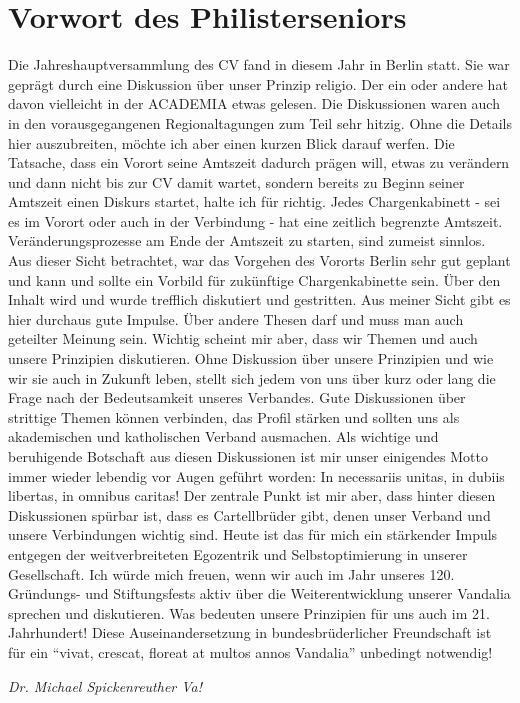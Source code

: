 \section{Vorwort des Philisterseniors}


\begin{multicols}{2}

Die Jahreshauptversammlung des CV fand in diesem Jahr in Berlin statt. Sie war geprägt durch eine Diskussion über unser Prinzip religio. Der ein oder andere hat davon vielleicht in der ACADEMIA etwas gelesen. Die Diskussionen waren auch in den vorausgegangenen Regionaltagungen zum Teil sehr hitzig. Ohne die Details hier auszubreiten, möchte ich aber einen kurzen Blick darauf werfen. Die Tatsache, dass ein Vorort seine Amtszeit dadurch prägen will, etwas zu verändern und dann nicht bis zur CV damit wartet, sondern bereits zu Beginn seiner Amtszeit einen Diskurs startet, halte ich für richtig. Jedes Chargenkabinett - sei es im Vorort oder auch in der Verbindung - hat eine zeitlich begrenzte Amtszeit. Veränderungsprozesse am Ende der Amtszeit zu starten, sind zumeist sinnlos. Aus dieser Sicht betrachtet, war das Vorgehen des Vororts Berlin sehr gut geplant und kann und sollte ein Vorbild für zukünftige Chargenkabinette sein.
Über den Inhalt wird und wurde trefflich diskutiert und gestritten. Aus meiner Sicht gibt es hier durchaus gute Impulse. Über andere Thesen darf und muss man auch geteilter Meinung sein. Wichtig scheint mir aber, dass wir Themen und auch unsere Prinzipien diskutieren. Ohne Diskussion über unsere Prinzipien und wie wir sie auch in Zukunft leben, stellt sich jedem von uns über kurz oder lang die Frage nach der Bedeutsamkeit unseres Verbandes.
Gute Diskussionen über strittige Themen können verbinden, das Profil stärken und sollten uns als akademischen und katholischen Verband ausmachen. Als wichtige und beruhigende Botschaft aus diesen Diskussionen ist mir unser einigendes Motto immer wieder lebendig vor Augen geführt worden: \glqq In necessariis unitas, in dubiis libertas, in omnibus caritas\grqq!
Der zentrale Punkt ist mir aber, dass hinter diesen Diskussionen spürbar ist, dass es Cartellbrüder gibt, denen unser Verband und unsere Verbindungen wichtig sind. Heute ist das für mich ein stärkender Impuls entgegen der weitverbreiteten Egozentrik und Selbstoptimierung in unserer Gesellschaft.
Ich würde mich freuen, wenn wir auch im Jahr unseres 120. Gründungs- und Stiftungsfests aktiv über die Weiterentwicklung unserer Vandalia sprechen und diskutieren. Was bedeuten unsere Prinzipien für uns auch im 21. Jahrhundert! Diese Auseinandersetzung in bundesbrüderlicher Freundschaft ist für ein “vivat, crescat, floreat at multos annos Vandalia” unbedingt notwendig! 

\end{multicols}
\begin{flushright}
		\hfill\emph{Dr. Michael Spickenreuther Va!}
	\end{flushright}